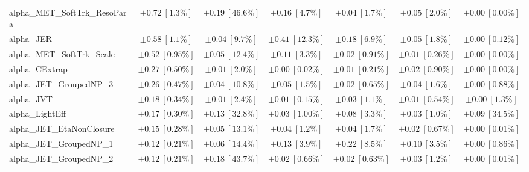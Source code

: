 \begin{sidewaystable}
\begin{center}
\begin{tabular*}{\textwidth}{@{\extracolsep{\fill}}lcccccc}
alpha\_MET\_SoftTrk\_ResoPara         & $\pm 0.72\ [1.3\%] $          & $\pm 0.19\ [46.6\%] $          & $\pm 0.16\ [4.7\%] $          & $\pm 0.04\ [1.7\%] $          & $\pm 0.05\ [2.0\%] $          & $\pm 0.00\ [0.00\%] $       \\
alpha\_JER         & $\pm 0.58\ [1.1\%] $          & $\pm 0.04\ [9.7\%] $          & $\pm 0.41\ [12.3\%] $          & $\pm 0.18\ [6.9\%] $          & $\pm 0.05\ [1.8\%] $          & $\pm 0.00\ [0.12\%] $       \\
alpha\_MET\_SoftTrk\_Scale         & $\pm 0.52\ [0.95\%] $          & $\pm 0.05\ [12.4\%] $          & $\pm 0.11\ [3.3\%] $          & $\pm 0.02\ [0.91\%] $          & $\pm 0.01\ [0.26\%] $          & $\pm 0.00\ [0.00\%] $       \\
alpha\_CExtrap         & $\pm 0.27\ [0.50\%] $          & $\pm 0.01\ [2.0\%] $          & $\pm 0.00\ [0.02\%] $          & $\pm 0.01\ [0.21\%] $          & $\pm 0.02\ [0.90\%] $          & $\pm 0.00\ [0.00\%] $       \\
alpha\_JET\_GroupedNP\_3         & $\pm 0.26\ [0.47\%] $          & $\pm 0.04\ [10.8\%] $          & $\pm 0.05\ [1.5\%] $          & $\pm 0.02\ [0.65\%] $          & $\pm 0.04\ [1.6\%] $          & $\pm 0.00\ [0.88\%] $       \\
alpha\_JVT         & $\pm 0.18\ [0.34\%] $          & $\pm 0.01\ [2.4\%] $          & $\pm 0.01\ [0.15\%] $          & $\pm 0.03\ [1.1\%] $          & $\pm 0.01\ [0.54\%] $          & $\pm 0.00\ [1.3\%] $       \\
alpha\_LightEff         & $\pm 0.17\ [0.30\%] $          & $\pm 0.13\ [32.8\%] $          & $\pm 0.03\ [1.00\%] $          & $\pm 0.08\ [3.3\%] $          & $\pm 0.03\ [1.0\%] $          & $\pm 0.09\ [34.5\%] $       \\
alpha\_JET\_EtaNonClosure         & $\pm 0.15\ [0.28\%] $          & $\pm 0.05\ [13.1\%] $          & $\pm 0.04\ [1.2\%] $          & $\pm 0.04\ [1.7\%] $          & $\pm 0.02\ [0.67\%] $          & $\pm 0.00\ [0.01\%] $       \\
alpha\_JET\_GroupedNP\_1         & $\pm 0.12\ [0.21\%] $          & $\pm 0.06\ [14.4\%] $          & $\pm 0.13\ [3.9\%] $          & $\pm 0.22\ [8.5\%] $          & $\pm 0.10\ [3.5\%] $          & $\pm 0.00\ [0.86\%] $       \\
alpha\_JET\_GroupedNP\_2         & $\pm 0.12\ [0.21\%] $          & $\pm 0.18\ [43.7\%] $          & $\pm 0.02\ [0.66\%] $          & $\pm 0.02\ [0.63\%] $          & $\pm 0.03\ [1.2\%] $          & $\pm 0.00\ [0.01\%] $       \\

\end{tabular*}
\end{center}
\end{sidewaystable}
